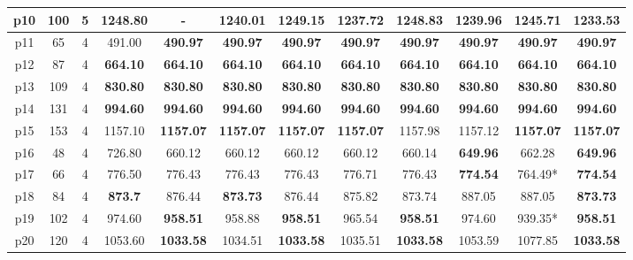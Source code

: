 \begin{table}[h!]
\begin{tabular}{|c|c|c|c|c|c|c|c|c|c|c|c|}
    p10      & 100 & 5  & 1248.80         & -                & 1240.01          & 1249.15          & 1237.72          & 1248.83          & 1239.96          & 1245.71          & \textbf{1233.53} \\\hline
    p11      & 65  & 4  & 491.00          & \textbf{490.97}  & \textbf{490.97}  & \textbf{490.97}  & \textbf{490.97}  & \textbf{490.97}  & \textbf{490.97}  & \textbf{490.97}  & \textbf{490.97}  \\\hline
    p12      & 87  & 4  & \textbf{664.10} & \textbf{664.10}  & \textbf{664.10}  & \textbf{664.10}  & \textbf{664.10}  & \textbf{664.10}  & \textbf{664.10}  & \textbf{664.10}  & \textbf{664.10}  \\\hline
    p13      & 109 & 4  & \textbf{830.80} & \textbf{830.80}  & \textbf{830.80}  & \textbf{830.80}  & \textbf{830.80}  & \textbf{830.80}  & \textbf{830.80}  & \textbf{830.80}  & \textbf{830.80}  \\\hline
    p14      & 131 & 4  & \textbf{994.60} & \textbf{994.60}  & \textbf{994.60}  & \textbf{994.60}  & \textbf{994.60}  & \textbf{994.60}  & \textbf{994.60}  & \textbf{994.60}  & \textbf{994.60}  \\\hline
    p15      & 153 & 4  & 1157.10         & \textbf{1157.07} & \textbf{1157.07} & \textbf{1157.07} & \textbf{1157.07} & 1157.98          & 1157.12          & \textbf{1157.07} & \textbf{1157.07} \\\hline
    p16      & 48  & 4  & 726.80          & 660.12           & 660.12           & 660.12           & 660.12           & 660.14           & \textbf{649.96}  & 662.28           & \textbf{649.96}  \\\hline
    p17      & 66  & 4  & 776.50          & 776.43           & 776.43           & 776.43           & 776.71           & 776.43           & \textbf{774.54}  & 764.49*          & \textbf{774.54}  \\\hline
    p18      & 84  & 4  & \textbf{873.7}  & 876.44           & \textbf{873.73}  & 876.44           & 875.82           & 873.74           & 887.05           & 887.05           & \textbf{873.73}  \\\hline
    p19      & 102 & 4  & 974.60          & \textbf{958.51}  & 958.88           & \textbf{958.51}  & 965.54           & \textbf{958.51}  & 974.60           & 939.35*          & \textbf{958.51}  \\\hline
    p20      & 120 & 4  & 1053.60         & \textbf{1033.58} & 1034.51          & \textbf{1033.58} & 1035.51          & \textbf{1033.58} & 1053.59          & 1077.85          & \textbf{1033.58} \\\hline

\end{tabular}
\end{table}
